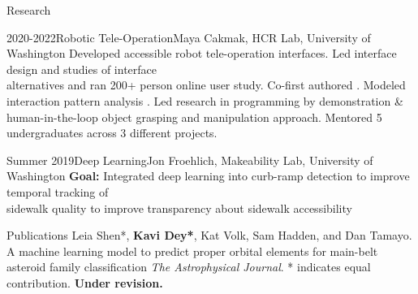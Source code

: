 \documentclass[]{mcdowellcv}
\begin{document}
\begin{cvsection}{Research}
	\begin{cvsubsection}{2020-2022}{Robotic Tele-Operation}{Maya Cakmak, HCR Lab, University of Washington}
		Developed accessible robot tele-operation interfaces.
		Led interface design and studies of interface \\ alternatives and ran 200+ person online user study. Co-first authored  .
		Modeled interaction pattern analysis .
		Led research in programming by demonstration \& human-in-the-loop object grasping and manipulation approach.
		Mentored 5 undergraduates across 3 different projects.
	\end{cvsubsection}

	\begin{cvsubsection}{Summer 2019}{Deep Learning}{Jon Froehlich, Makeability Lab, University of Washington}
		\textbf{Goal:} Integrated deep learning into curb-ramp detection to improve temporal tracking of \\ sidewalk quality to improve transparency about sidewalk accessibility
	\end{cvsubsection}
\end{cvsection}

\begin{cvsection}{Publications}
	Leia Shen*, \textbf{Kavi Dey*}, Kat Volk, Sam Hadden, and Dan Tamayo. A machine learning model to predict proper orbital elements for main-belt asteroid family classification
	\textit{The Astrophysical Journal}. * indicates equal contribution. \textbf{Under revision.}


	


	

\end{cvsection}
\end{document}
